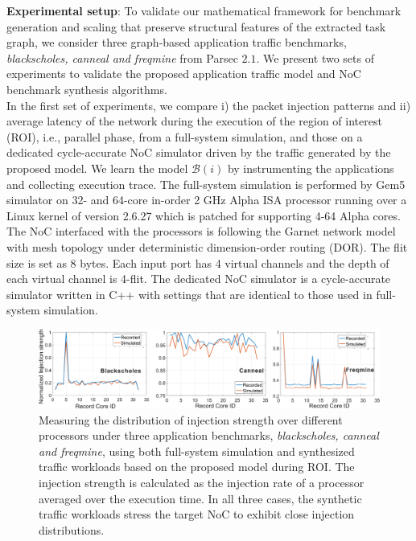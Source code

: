 \noindent\textbf{Experimental setup}: To validate our mathematical framework for benchmark generation and scaling that preserve structural features of the extracted task graph, we consider three graph-based application traffic benchmarks, \textit{blackscholes, canneal and freqmine} from Parsec $2.1$.  We present two sets of experiments to validate the proposed application traffic model and NoC benchmark synthesis algorithms. \\
\indent In the first set of experiments, we compare i) the packet injection patterns and ii) average latency of the network during the execution of the region of interest (ROI), i.e., parallel phase, from a full-system simulation,  and those on a dedicated cycle-accurate NoC simulator driven by the traffic generated by the proposed model. We learn the model $\mathcal B(i)$ by instrumenting the applications and collecting execution trace. The full-system simulation is performed by Gem5 simulator  on 32- and 64-core in-order 2 GHz Alpha ISA processor running over a Linux kernel of version 2.6.27 which is patched for supporting 4-64 Alpha cores. The NoC interfaced with the processors is following the Garnet network model with mesh topology under deterministic dimension-order routing (DOR). The flit size is set as 8 bytes. Each input port has 4 virtual channels and the depth of each virtual channel is 4-flit. The dedicated NoC simulator is a cycle-accurate simulator written in C++ with settings that are identical to those used in full-system simulation.\\
\begin{figure}%
  \centering
  \includegraphics[width=1\columnwidth]{norm.eps}
  \vskip -2mm
  \caption{Measuring the distribution of injection strength over different processors under three application benchmarks, \textit{blackscholes, canneal and freqmine}, using both full-system simulation and synthesized traffic workloads based on the proposed model during ROI. The injection strength is calculated as the injection rate of a processor averaged over the execution time. In all three cases, the synthetic traffic workloads stress the target NoC to exhibit close injection distributions.}
  \label{fig:traffic_sim}
  \vskip -5mm
\end{figure}
